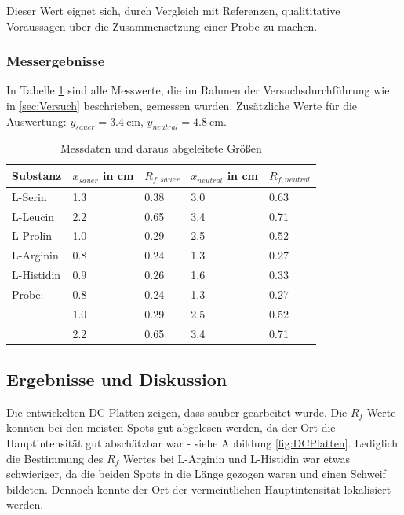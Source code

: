 \documentclass{article}
\begin{document}
        Dieser Wert eignet sich, durch Vergleich mit Referenzen, qualititative Voraussagen über die Zusammensetzung einer Probe zu machen.
        
      \subsubsection{Messergebnisse}
    
        In Tabelle \ref{tab:Messdaten} sind alle Messwerte, die im Rahmen der Versuchsdurchführung wie in \ref{sec:Versuch} beschrieben, gemessen wurden. Zusätzliche Werte für die Auswertung: $y_{sauer}=\SI[mode=text]{3.4}{\centi\meter}$, $y_{neutral}=\SI[mode=text]{4.8}{\centi\meter}$.
      
        \begin{table}[H]
          \centering
          \caption[Messdaten der Dünnschichtchromatographie und daraus abgeleitete Größen, Quelle: Autor]{Messdaten und daraus abgeleitete Größen}
          \label{tab:Messdaten}
            \begin{tabular}{@{}l|ll|ll@{}}
              \toprule
               Substanz & $x_{sauer}$ in \si{\centi\meter} & $R_{f,sauer}$ & $x_{neutral}$ in \si{\centi\meter} & $R_{f,neutral}$ \\ \midrule
               L-Serin & 1.3 & 0.38 & 3.0 & 0.63 \\
               L-Leucin & 2.2 & 0.65 & 3.4 & 0.71 \\
               L-Prolin & 1.0 & 0.29 & 2.5 & 0.52 \\
               L-Arginin & 0.8 & 0.24 & 1.3 & 0.27 \\
               L-Histidin & 0.9 & 0.26 & 1.6 & 0.33 \\ \midrule
               Probe: & 0.8 & 0.24 & 1.3 & 0.27 \\
                      & 1.0 & 0.29 & 2.5 & 0.52 \\
                      & 2.2 & 0.65 & 3.4 & 0.71 \\ \bottomrule
            \end{tabular}
         \end{table}      
      
    \subsection{Ergebnisse und Diskussion}
    
      Die entwickelten DC-Platten zeigen, dass sauber gearbeitet wurde. Die $R_{f}$ Werte konnten bei den meisten Spots gut abgelesen werden, da der Ort die Hauptintensität gut abschätzbar war - siehe Abbildung \ref{fig:DCPlatten}. Lediglich die Bestimmung des $R_{f}$ Wertes bei L-Arginin und L-Histidin war etwas schwieriger, da die beiden Spots in die Länge gezogen waren und einen Schweif bildeten. Dennoch konnte der Ort der vermeintlichen Hauptintensität lokalisiert werden. \\
      
\end{document}
